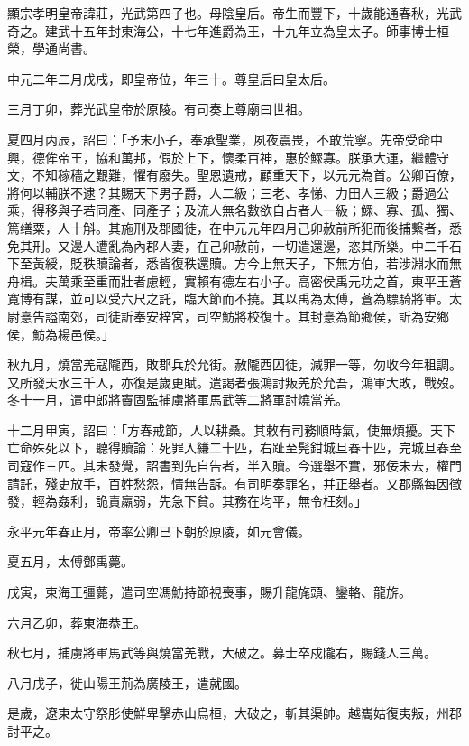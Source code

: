 
\begin{pinyinscope}
顯宗孝明皇帝諱莊，光武第四子也。母陰皇后。帝生而豐下，十歲能通春秋，光武奇之。建武十五年封東海公，十七年進爵為王，十九年立為皇太子。師事博士桓榮，學通尚書。

中元二年二月戊戌，即皇帝位，年三十。尊皇后曰皇太后。

三月丁卯，葬光武皇帝於原陵。有司奏上尊廟曰世祖。

夏四月丙辰，詔曰：「予末小子，奉承聖業，夙夜震畏，不敢荒寧。先帝受命中興，德侔帝王，協和萬邦，假於上下，懷柔百神，惠於鰥寡。朕承大運，繼體守文，不知稼穡之艱難，懼有廢失。聖恩遺戒，顧重天下，以元元為首。公卿百僚，將何以輔朕不逮？其賜天下男子爵，人二級；三老、孝悌、力田人三級；爵過公乘，得移與子若同產、同產子；及流人無名數欲自占者人一級；鰥、寡、孤、獨、篤缮粟，人十斛。其施刑及郡國徒，在中元元年四月己卯赦前所犯而後捕繫者，悉免其刑。又邊人遭亂為內郡人妻，在己卯赦前，一切遣還邊，恣其所樂。中二千石下至黃綬，貶秩贖論者，悉皆復秩還贖。方今上無天子，下無方伯，若涉淵水而無舟楫。夫萬乘至重而壯者慮輕，實賴有德左右小子。高密侯禹元功之首，東平王蒼寬博有謀，並可以受六尺之託，臨大節而不撓。其以禹為太傅，蒼為驃騎將軍。太尉憙告謚南郊，司徒訢奉安梓宮，司空魴將校復土。其封憙為節鄉侯，訢為安鄉侯，魴為楊邑侯。」

秋九月，燒當羌寇隴西，敗郡兵於允街。赦隴西囚徒，減罪一等，勿收今年租調。又所發天水三千人，亦復是歲更賦。遣謁者張鴻討叛羌於允吾，鴻軍大敗，戰歿。冬十一月，遣中郎將竇固監捕虜將軍馬武等二將軍討燒當羌。

十二月甲寅，詔曰：「方春戒節，人以耕桑。其敕有司務順時氣，使無煩擾。天下亡命殊死以下，聽得贖論：死罪入縑二十匹，右趾至髡鉗城旦舂十匹，完城旦舂至司寇作三匹。其未發覺，詔書到先自告者，半入贖。今選舉不實，邪佞未去，權門請託，殘吏放手，百姓愁怨，情無告訴。有司明奏罪名，并正舉者。又郡縣每因徵發，輕為姦利，詭責羸弱，先急下貧。其務在均平，無令枉刻。」

永平元年春正月，帝率公卿已下朝於原陵，如元會儀。

夏五月，太傅鄧禹薨。

戊寅，東海王彊薨，遣司空馮魴持節視喪事，賜升龍旄頭、鑾輅、龍旂。

六月乙卯，葬東海恭王。

秋七月，捕虜將軍馬武等與燒當羌戰，大破之。募士卒戍隴右，賜錢人三萬。

八月戊子，徙山陽王荊為廣陵王，遣就國。

是歲，遼東太守祭肜使鮮卑擊赤山烏桓，大破之，斬其渠帥。越巂姑復夷叛，州郡討平之。


\end{pinyinscope}
